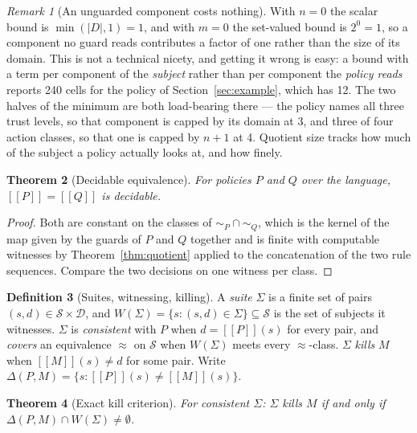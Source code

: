 \documentclass[11pt,a4paper]{article}
\theoremstyle{plain}
\newtheorem{theorem}{Theorem}
\theoremstyle{definition}
\newtheorem{definition}[theorem]{Definition}
\theoremstyle{remark}
\newtheorem{remark}[theorem]{Remark}
\newcommand{\sem}[1]{[\![#1]\!]}
\newcommand{\Dom}{\mathcal{D}}
\newcommand{\Sub}{\mathcal{S}}
\begin{document}
\begin{remark}[An unguarded component costs nothing]
\label{rem:unguarded}
With $n = 0$ the scalar bound is $\min(|D|, 1) = 1$, and with $m = 0$ the set-valued bound is
$2^0 = 1$, so a component no guard reads contributes a factor of one rather than the size of
its domain. This is not a technical nicety, and getting it wrong is easy: a bound with a term
per component of the \emph{subject} rather than per component the \emph{policy reads} reports
240 cells for the policy of Section~\ref{sec:example}, which has 12. The two halves of the
minimum are both load-bearing there --- the policy names all three trust levels, so that
component is capped by its domain at 3, and three of four action classes, so that one is
capped by $n+1$ at 4. Quotient size tracks how much of the subject a policy actually looks
at, and how finely.
\end{remark}

\begin{theorem}[Decidable equivalence]
\label{thm:equivalence}
For policies $P$ and $Q$ over the language, $\sem{P} = \sem{Q}$ is decidable.
\end{theorem}

\begin{proof}
Both are constant on the classes of $\sim_P \cap \sim_Q$, which is the kernel of the map
given by the guards of $P$ and $Q$ together and is finite with computable witnesses by
Theorem~\ref{thm:quotient} applied to the concatenation of the two rule sequences. Compare
the two decisions on one witness per class.
\end{proof}

\begin{definition}[Suites, witnessing, killing]
A \emph{suite} $\Sigma$ is a finite set of pairs $(s,d) \in \Sub \times \Dom$, and
$W(\Sigma) = \{s : (s,d) \in \Sigma\} \subseteq \Sub$ is the set of subjects it witnesses.
$\Sigma$ is \emph{consistent} with $P$ when $d = \sem{P}(s)$ for every pair, and
\emph{covers} an equivalence $\approx$ on $\Sub$ when $W(\Sigma)$ meets every
$\approx$-class. $\Sigma$ \emph{kills} $M$ when $\sem{M}(s) \neq d$ for some pair. Write
$\Delta(P,M) = \{s : \sem{P}(s) \neq \sem{M}(s)\}$.
\end{definition}

\begin{theorem}[Exact kill criterion]
\label{thm:kill}
For consistent $\Sigma$: $\Sigma$ kills $M$ if and only if
$\Delta(P,M) \cap W(\Sigma) \neq \emptyset$.
\end{theorem}
\end{document}
